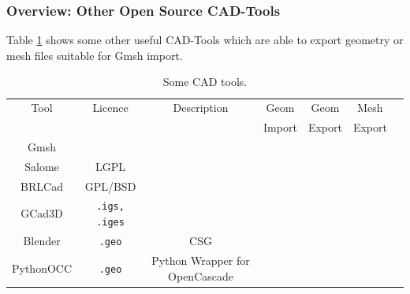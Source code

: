 \begin{frame}
  \frametitle{Overview: Other Open Source CAD-Tools}
  \begin{table}
    Table \ref{tab:CADTools} shows some other useful CAD-Tools which are able to
    export geometry or mesh files suitable for Gmsh import.
    \begin{center}
      \begin{tabular}{|c|c|c|c|c|c|c|}
        \hline
        Tool & Licence & Description & Geom & Geom & Mesh
        \\
        &  &  & Import & Export & Export
        \\
        \hline
        \hline
        Gmsh &  &  &  &  &
        \\
        \hline
        Salome & LGPL & &  &  &
        \\
        \hline
        BRLCad & GPL/BSD & &  &  &
        \\
        \hline
        GCad3D & \lstinline!.igs, .iges! & &  &  &
        \\
        \hline
        Blender & \lstinline!.geo! & CSG &  &  &
        \\
        \hline
        PythonOCC & \lstinline!.geo! & Python Wrapper for OpenCascade &  &  &
        \\
        \hline
      \end{tabular}
      \caption{Some CAD tools.}
      \label{tab:CADTools}
    \end{center}
  \end{table}
\end{frame}

\cleardoublepage
